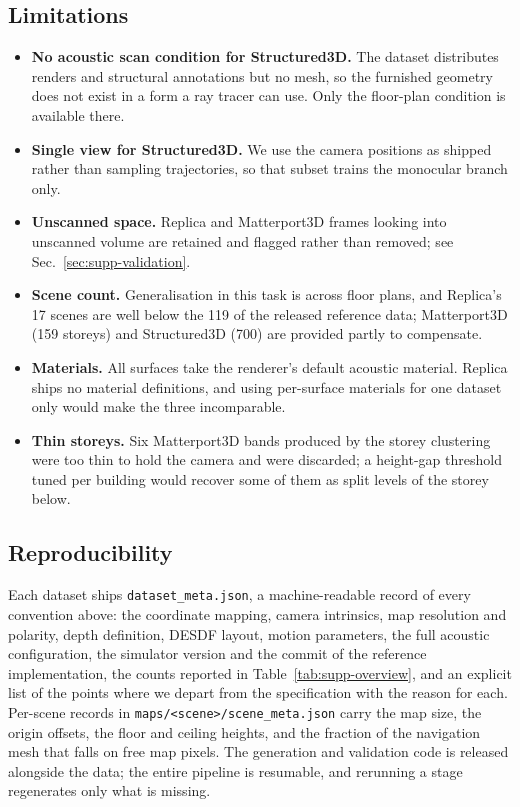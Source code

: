 \subsection{Limitations}
\label{sec:supp-limitations}

\begin{itemize}
  \item \textbf{No acoustic scan condition for Structured3D.} The dataset
        distributes renders and structural annotations but no mesh, so the
        furnished geometry does not exist in a form a ray tracer can use. Only the
        floor-plan condition is available there.
  \item \textbf{Single view for Structured3D.} We use the camera positions as
        shipped rather than sampling trajectories, so that subset trains the
        monocular branch only.
  \item \textbf{Unscanned space.} Replica and Matterport3D frames looking into
        unscanned volume are retained and flagged rather than removed; see
        Sec.~\ref{sec:supp-validation}.
  \item \textbf{Scene count.} Generalisation in this task is across floor plans,
        and Replica's 17 scenes are well below the 119 of the released reference
        data; Matterport3D (159 storeys) and Structured3D (700) are provided
        partly to compensate.
  \item \textbf{Materials.} All surfaces take the renderer's default acoustic
        material. Replica ships no material definitions, and using per-surface
        materials for one dataset only would make the three incomparable.
  \item \textbf{Thin storeys.} Six Matterport3D bands produced by the storey
        clustering were too thin to hold the camera and were discarded; a
        height-gap threshold tuned per building would recover some of them as
        split levels of the storey below.
\end{itemize}

\subsection{Reproducibility}
\label{sec:supp-repro}

Each dataset ships \texttt{dataset\_meta.json}, a machine-readable record of every
convention above: the coordinate mapping, camera intrinsics, map resolution and
polarity, depth definition, DESDF layout, motion parameters, the full acoustic
configuration, the simulator version and the commit of the reference
implementation, the counts reported in Table~\ref{tab:supp-overview}, and an
explicit list of the points where we depart from the specification with the reason
for each. Per-scene records in \texttt{maps/<scene>/scene\_meta.json} carry the map
size, the origin offsets, the floor and ceiling heights, and the fraction of the
navigation mesh that falls on free map pixels. The generation and validation code
is released alongside the data; the entire pipeline is resumable, and rerunning a
stage regenerates only what is missing.
